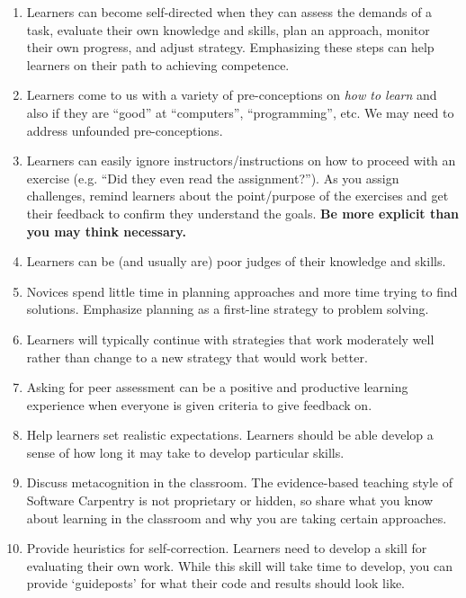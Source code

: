 \begin{enumerate}
\item
  Learners can become self-directed when they can assess the demands of
  a task, evaluate their own knowledge and skills, plan an approach,
  monitor their own progress, and adjust strategy. Emphasizing these
  steps can help learners on their path to achieving competence.
\item
  Learners come to us with a variety of pre-conceptions on \emph{how to
  learn} and also if they are ``good'' at ``computers'',
  ``programming'', etc. We may need to address unfounded
  pre-conceptions.
\item
  Learners can easily ignore instructors/instructions on how to proceed
  with an exercise (e.g. ``Did they even read the assignment?''). As you
  assign challenges, remind learners about the point/purpose of the
  exercises and get their feedback to confirm they understand the goals.
  \textbf{Be more explicit than you may think necessary.}
\item
  Learners can be (and usually are) poor judges of their knowledge and
  skills.
\item
  Novices spend little time in planning approaches and more time trying
  to find solutions. Emphasize planning as a first-line strategy to
  problem solving.
\item
  Learners will typically continue with strategies that work moderately
  well rather than change to a new strategy that would work better.
\item
  Asking for peer assessment can be a positive and productive learning
  experience when everyone is given criteria to give feedback on.
\item
  Help learners set realistic expectations. Learners should be able
  develop a sense of how long it may take to develop particular skills.
\item
  Discuss metacognition in the classroom. The evidence-based teaching
  style of Software Carpentry is not proprietary or hidden, so share
  what you know about learning in the classroom and why you are taking
  certain approaches.
\item
  Provide heuristics for self-correction. Learners need to develop a
  skill for evaluating their own work. While this skill will take time
  to develop, you can provide `guideposts' for what their code and
  results should look like.
\end{enumerate}


